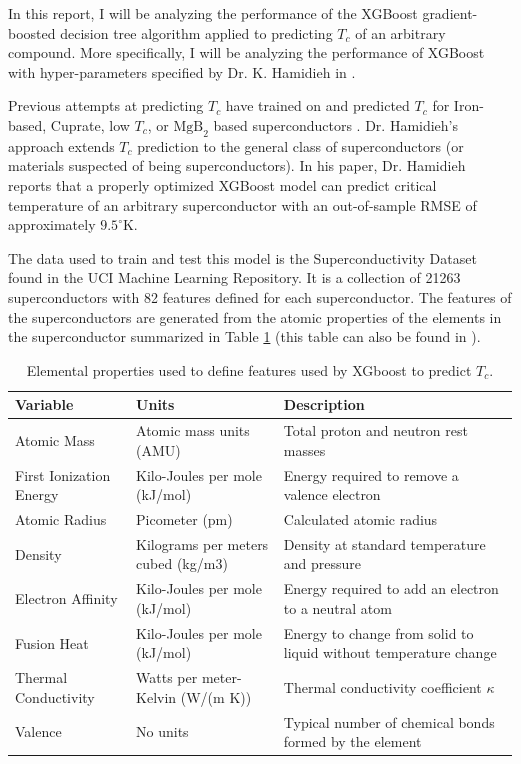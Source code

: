 \documentclass[oneside,12pt]{amsart}
\begin{document}
In this report, I will be analyzing the performance of the XGBoost gradient-boosted decision tree algorithm \cite{chen_xgboost_2020} applied to predicting $T_c$ of an arbitrary compound. More specifically, I will be analyzing the performance of XGBoost with hyper-parameters specified by Dr. K. Hamidieh in \cite{hamidieh_data-driven_2018}. 

 Previous attempts at predicting $T_c$ have trained on and predicted $T_c$ for Iron-based, Cuprate, low $T_c$, or $\text{MgB}_2$ based superconductors \cite{owolabi_estimation_2015}\cite{stanev_machine_2018}. Dr. Hamidieh's approach extends $T_c$ prediction to the general class of superconductors (or materials suspected of being superconductors). In his paper, Dr. Hamidieh reports that a properly optimized XGBoost model can predict critical temperature of an arbitrary superconductor with an out-of-sample RMSE of approximately $9.5^\circ$K. 
 
 The data used to train and test this model is the Superconductivity Dataset found in the UCI Machine Learning Repository\cite{noauthor_superconductivity_2018}. It is a collection of 21263 superconductors with 82 features defined for each superconductor. The features of the superconductors are generated from the atomic properties of the elements in the superconductor summarized in Table \ref{tab:elemental_properties} (this table can also be found in \cite{hamidieh_data-driven_2018}).
 
 \begin{table}[h]
     \centering
     \tiny
     \begin{tabularx}{\linewidth}{X X X}
          \hline
          Variable & Units & Description\\
          \hline
        Atomic Mass &Atomic mass units (AMU) &Total proton and neutron rest masses\\
        First Ionization Energy &Kilo-Joules per mole (kJ/mol)&Energy required to remove a valence electron\\
        Atomic Radius & Picometer (pm) &Calculated atomic radius\\
        Density&Kilograms per meters cubed (kg/m3)&Density at standard temperature and pressure\\
        Electron Affinity &Kilo-Joules per mole (kJ/mol) &Energy required to add an electron to a neutral atom\\
        Fusion Heat &Kilo-Joules per mole (kJ/mol) &Energy to change from solid to liquid without temperature change\\
        Thermal Conductivity &Watts per meter-Kelvin (W/(m K)) &Thermal conductivity coefficient $\kappa$\\
        Valence &No units &Typical number of chemical bonds formed by the element\\
        \hline
     \end{tabularx}
     \caption{Elemental properties used to define features used by XGboost to predict $T_c$. }
     \label{tab:elemental_properties}
 \end{table}
 
\end{document}
